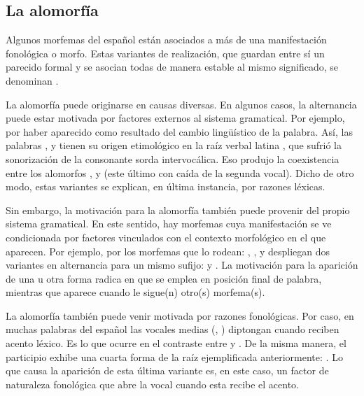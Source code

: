\subsection{La alomorfía}\label{sec:04-alomorfia}

Algunos morfemas del español están asociados a más de una manifestación
fonológica o morfo. Estas variantes de realización, que guardan entre sí un
parecido formal y se asocian todas de manera estable al mismo significado, se
denominan .

La alomorfía puede originarse en causas diversas. En algunos casos, la
alternancia puede estar motivada por factores externos al sistema gramatical.
Por ejemplo, por haber aparecido como resultado del cambio lingüístico de la
palabra. Así, las palabras ,  y
 tienen su origen etimológico en la raíz verbal latina
, que sufrió la sonorización de la consonante sorda intervocálica.
Eso produjo la coexistencia entre los alomorfos ,  y
 (este último con caída de la segunda vocal). Dicho de otro modo,
estas variantes se explican, en última instancia, por razones léxicas.

Sin embargo, la motivación para la alomorfía también puede provenir del propio
sistema gramatical. En este sentido, hay morfemas cuya manifestación se ve
condicionada por factores vinculados con el contexto morfológico en el que
aparecen. Por ejemplo, por los morfemas que lo rodean: ,
,  y 
despliegan dos variantes en alternancia para un mismo sufijo:  y
. La motivación para la aparición de una u otra forma radica en que
 se emplea en posición final de palabra, mientras que 
aparece cuando le sigue(n) otro(s) morfema(s).

La alomorfía también puede venir motivada por razones fonológicas. Por caso, en
muchas palabras del español las vocales medias (, ) diptongan
cuando reciben acento léxico. Es lo que ocurre en el contraste entre
 y . De la misma manera, el participio
 exhibe una cuarta forma de la raíz ejemplificada
anteriormente: . Lo que causa la aparición de esta última variante
es, en este caso, un factor de naturaleza fonológica que abre la vocal cuando
esta recibe el acento.

